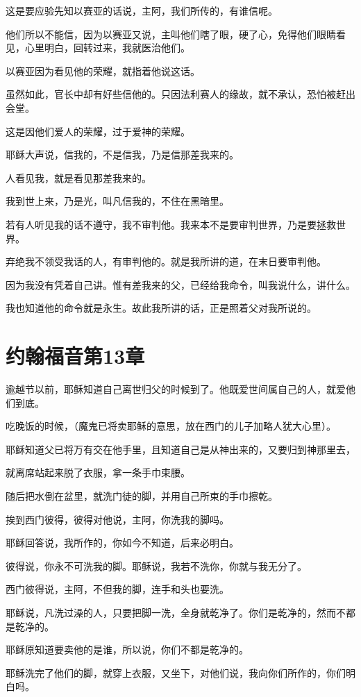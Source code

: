 \documentclass[12pt,oneside]{book}
\begin{document}
这是要应验先知以赛亚的话说，主阿，我们所传的，有谁信呢。

他们所以不能信，因为以赛亚又说，主叫他们瞎了眼，硬了心，免得他们眼睛看见，心里明白，回转过来，我就医治他们。

以赛亚因为看见他的荣耀，就指着他说这话。

虽然如此，官长中却有好些信他的。只因法利赛人的缘故，就不承认，恐怕被赶出会堂。

这是因他们爱人的荣耀，过于爱神的荣耀。

耶稣大声说，信我的，不是信我，乃是信那差我来的。

人看见我，就是看见那差我来的。

我到世上来，乃是光，叫凡信我的，不住在黑暗里。

若有人听见我的话不遵守，我不审判他。我来本不是要审判世界，乃是要拯救世界。

弃绝我不领受我话的人，有审判他的。就是我所讲的道，在末日要审判他。

因为我没有凭着自己讲。惟有差我来的父，已经给我命令，叫我说什么，讲什么。

我也知道他的命令就是永生。故此我所讲的话，正是照着父对我所说的。

\chapter{约翰福音第13章}
逾越节以前，耶稣知道自己离世归父的时候到了。他既爱世间属自己的人，就爱他们到底。

吃晚饭的时候，（魔鬼已将卖耶稣的意思，放在西门的儿子加略人犹大心里）。

耶稣知道父已将万有交在他手里，且知道自己是从神出来的，又要归到神那里去，

就离席站起来脱了衣服，拿一条手巾束腰。

随后把水倒在盆里，就洗门徒的脚，并用自己所束的手巾擦乾。

挨到西门彼得，彼得对他说，主阿，你洗我的脚吗。

耶稣回答说，我所作的，你如今不知道，后来必明白。

彼得说，你永不可洗我的脚。耶稣说，我若不洗你，你就与我无分了。

西门彼得说，主阿，不但我的脚，连手和头也要洗。

耶稣说，凡洗过澡的人，只要把脚一洗，全身就乾净了。你们是乾净的，然而不都是乾净的。

耶稣原知道要卖他的是谁，所以说，你们不都是乾净的。

耶稣洗完了他们的脚，就穿上衣服，又坐下，对他们说，我向你们所作的，你们明白吗。
\end{document}
